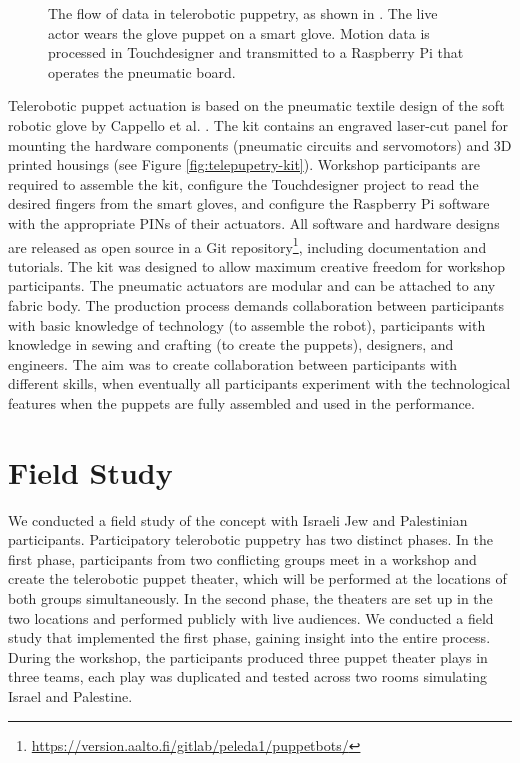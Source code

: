 \documentclass[dissertation,math,vertlayout,pdfa,colorlinks,nologo]{aaltoseries}
\begin{document}
\begin{figure}
    \centering
    
    \caption{The flow of data in telerobotic puppetry, as shown in \cite{peledTeleroboticTheaterOppressed2025}. The live actor wears the glove puppet on a smart glove. Motion data is processed in Touchdesigner and transmitted to a Raspberry Pi that operates the pneumatic board.}
    \label{fig:telepuppetry-diagram}
\end{figure}

Telerobotic puppet actuation is based on the pneumatic textile design of the soft robotic glove by Cappello et al. \cite{cappelloExploitingTextileMechanical2018,cappelloAssistingHandFunction2018}. The kit contains an engraved laser-cut panel for mounting the hardware components (pneumatic circuits and servomotors) and 3D printed housings (see Figure \ref{fig:telepupetry-kit}). Workshop participants are required to assemble the kit, configure the Touchdesigner project to read the desired fingers from the smart gloves, and configure the Raspberry Pi software with the appropriate PINs of their actuators. All software and hardware designs are released as open source in a Git repository\footnote{\url{https://version.aalto.fi/gitlab/peleda1/puppetbots/}}, including documentation and tutorials. The kit was designed to allow maximum creative freedom for workshop participants. The pneumatic actuators are modular and can be attached to any fabric body. The production process demands collaboration between participants with basic knowledge of technology (to assemble the robot), participants with knowledge in sewing and crafting (to create the puppets), designers, and engineers. The aim was to create collaboration between participants with different skills, when eventually all participants experiment with the technological features when the puppets are fully assembled and used in the performance.

\section{Field Study}
We conducted a field study of the concept with Israeli Jew and Palestinian participants. Participatory telerobotic puppetry has two distinct phases. In the first phase, participants from two conflicting groups meet in a workshop and create the telerobotic puppet theater, which will be performed at the locations of both groups simultaneously. In the second phase, the theaters are set up in the two locations and performed publicly with live audiences. We conducted a field study that implemented the first phase, gaining insight into the entire process. During the workshop, the participants produced three puppet theater plays in three teams, each play was duplicated and tested across two rooms simulating Israel and Palestine.
\end{document}
